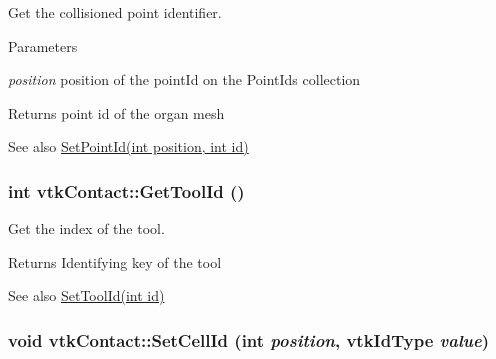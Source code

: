 Get the collisioned point identifier. 
\begin{DoxyParams}{Parameters}
\item[{\em position}]position of the pointId on the PointIds collection \end{DoxyParams}
\begin{DoxyReturn}{Returns}
point id of the organ mesh 
\end{DoxyReturn}
\begin{DoxySeeAlso}{See also}
\hyperlink{classvtkContact_ac0b98ed46f961f3b2c2357905bf069f6}{SetPointId(int position, int id)} 
\end{DoxySeeAlso}
\hypertarget{classvtkContact_a82d16317dbf303590a6d2834810b222c}{
\subsubsection[{GetToolId}]{\setlength{\rightskip}{0pt plus 5cm}int vtkContact::GetToolId ()}}
\label{classvtkContact_a82d16317dbf303590a6d2834810b222c}


Get the index of the tool. \begin{DoxyReturn}{Returns}
Identifying key of the tool 
\end{DoxyReturn}
\begin{DoxySeeAlso}{See also}
\hyperlink{classvtkContact_a449bcc29dbf1e58dcd342d949a9754cb}{SetToolId(int id)} 
\end{DoxySeeAlso}
\hypertarget{classvtkContact_a3ebc1a4dedf313b3f02f17a412cee88c}{
\subsubsection[{SetCellId}]{\setlength{\rightskip}{0pt plus 5cm}void vtkContact::SetCellId (int {\em position}, \/  vtkIdType {\em value})}}
\label{classvtkContact_a3ebc1a4dedf313b3f02f17a412cee88c}



